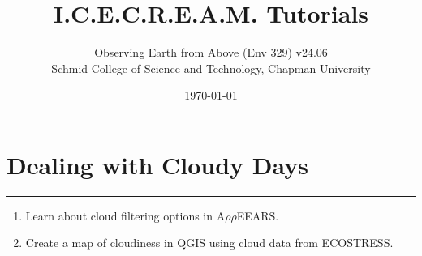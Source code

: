 \documentclass[oneside,a4paper,11pt,explicit]{book}
\title{I.C.E.C.R.E.A.M. Tutorials}
\subtitle{\small Observing Earth from Above (Env 329) v24.06  \\
	\small Schmid College of Science and Technology, Chapman University}
\date{\today}
\begin{document}
	
\dominitoc
	
\faketableofcontents
	
\setcounter{chapter}{5} %
	
\chapter{Dealing with Cloudy Days} %
	
\vspace{-2em}
	
\minitoc
	
\hrule
	
\vspace{1em}
	
\begin{tcolorbox}[enhanced,frame style image=blueshade.png,opacityback=0.75,opacitybacktitle=0.25,colback=blue!5!white,colframe=blue!75!black,title={\Large \textbf{Objectives:}}]
    \large
    \begin{enumerate}			
        \item Learn about cloud filtering options in A$\rho\rho$EEARS.
	\item Create a map of cloudiness in QGIS using cloud data from ECOSTRESS.
    \end{enumerate}
\end{tcolorbox}
	
\clearpage
	
\end{document}
